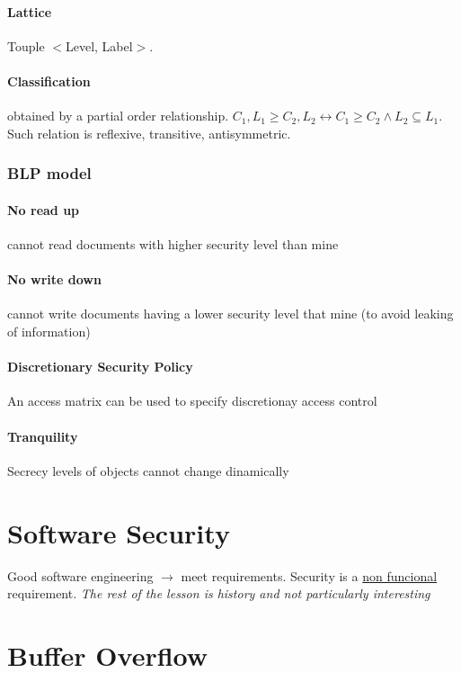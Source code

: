\documentclass{article}
\begin{document}
\paragraph{Lattice} Touple $<$Level, Label$>$.
\paragraph{Classification} obtained by a partial order relationship. ${C_1,L_1}\geq{C_2,L_2} \leftrightarrow C_1\geq C_2 \wedge L_2 \subseteq L_1$. Such relation is reflexive, transitive, antisymmetric.
\subsubsection{BLP model}

\paragraph{No read up} cannot read documents with higher security level than mine
\paragraph{No write down} cannot write documents having a lower security level that mine (to avoid leaking of information)
\paragraph{Discretionary Security Policy} An access matrix can be used to specify discretionay access control
\paragraph{Tranquility} Secrecy levels of objects cannot change dinamically
\section{Software Security}
Good software engineering $\rightarrow$ meet requirements. Security is a \underline{non funcional} requirement. \textit{The rest of the lesson is history and not particularly interesting}


\section{Buffer Overflow}
\end{document}
